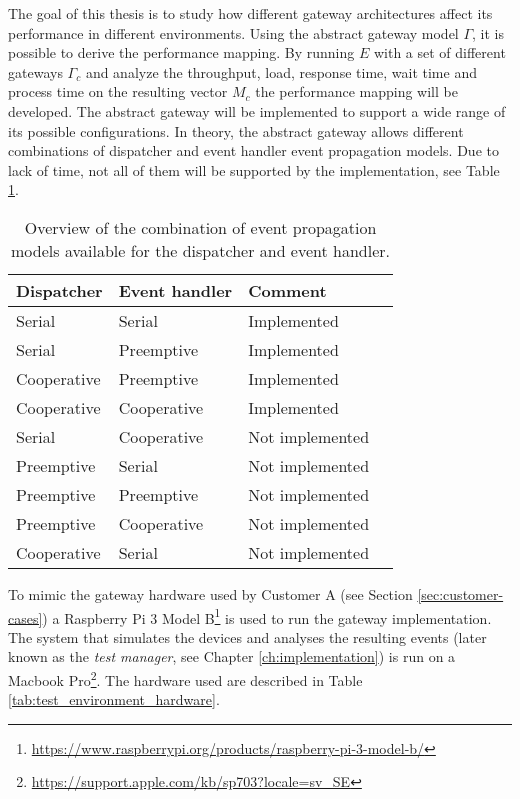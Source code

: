 The goal of this thesis is to study how different gateway architectures affect
its performance in different environments. Using the abstract gateway model
$\Gamma$, it is possible to derive the performance mapping. By running $E$ with
a set of different gateways $\Gamma_c$ and analyze the throughput, load,
response time, wait time and process time on the resulting vector $M_c$ the
performance mapping will be developed. The abstract gateway will be implemented
to support a wide range of its possible configurations. In theory, the abstract
gateway allows different combinations of dispatcher and event handler event
propagation models. Due to lack of time, not all of them will be supported by
the implementation, see Table \ref{tab:event_prop_combinations}.

\begin{table}[h!]

    \caption[Overview of the combination of event propagation models.]{Overview
    of the combination of event propagation models available for the dispatcher
    and event handler.}

    \label{tab:event_prop_combinations}

    \begin{center}
        \begin{tabular}{|l|l|l|l|}
            \hline
            Dispatcher  & Event handler & Comment \\
            \hline
            Serial      & Serial        & Implemented \\
            Serial      & Preemptive    & Implemented \\
            Cooperative & Preemptive    & Implemented \\
            Cooperative & Cooperative   & Implemented \\
            Serial      & Cooperative   & Not implemented \\
            Preemptive  & Serial        & Not implemented \\
            Preemptive  & Preemptive    & Not implemented \\
            Preemptive  & Cooperative   & Not implemented \\
            Cooperative & Serial        & Not implemented \\
            \hline
        \end{tabular}
    \end{center}
\end{table}

To mimic the gateway hardware used by Customer A (see Section
\ref{sec:customer-cases}) a Raspberry Pi 3 Model
B\footnote{\url{https://www.raspberrypi.org/products/raspberry-pi-3-model-b/}}
is used to run the gateway implementation. The system that simulates the
devices and analyses the resulting events (later known as the \textit{test
manager}, see Chapter \ref{ch:implementation}) is run on a Macbook
Pro\footnote{\url{https://support.apple.com/kb/sp703?locale=sv_SE}}. The
hardware used are described in Table \ref{tab:test_environment_hardware}.

